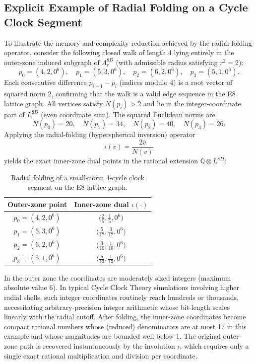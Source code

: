 \documentclass{article}
\begin{document}
\subsection{Explicit Example of Radial Folding on a Cycle Clock Segment}
To illustrate the memory and complexity reduction achieved by the radial-folding operator, consider the following closed walk of length 4 lying entirely in the outer-zone induced subgraph of \(\Lambda_r^{8D}\) (with admissible radius satisfying \(r^2=2\)):
\[
p_0 = (4, 2, 0^6),\quad
p_1 = (5, 3, 0^6),\quad
p_2 = (6, 2, 0^6),\quad
p_3 = (5, 1, 0^6).
\]
Each consecutive difference \(p_{i+1} - p_i\) (indices modulo 4) is a root vector of squared norm 2, confirming that the walk is a valid edge sequence in the E8 lattice graph. All vertices satisfy \(N(p_i) > 2\) and lie in the integer-coordinate part of \(L^{8D}\) (even coordinate sum). The squared Euclidean norms are
\[
N(p_0) = 20,\quad N(p_1) = 34,\quad N(p_2) = 40,\quad N(p_3) = 26.
\]
Applying the radial-folding (hyperspherical inversion) operator
\[
\iota(v) = \frac{2 \bar{v}}{N(v)}
\]
yields the exact inner-zone dual points in the rational extension \(\mathbb{Q} \otimes L^{8D}\):
\begin{table}[htbp]
\centering
\caption{Radial folding of a small-norm 4-cycle clock segment on the E8 lattice graph.}
\label{tab:radial-fold-example}
\begin{tabular}{c|c}
\textbf{Outer-zone point} & \textbf{Inner-zone dual \(\iota(\cdot)\)} \\
\hline
\(p_0 = (4,2,0^6)\) & \(\bigl( \frac{2}{5},\frac{1}{5},0^6 \bigr)\) \\
\(p_1 = (5,3,0^6)\) & \(\bigl( \frac{5}{17},\frac{3}{17},0^6 \bigr)\) \\
\(p_2 = (6,2,0^6)\) & \(\bigl( \frac{3}{10},\frac{1}{10},0^6 \bigr)\) \\
\(p_3 = (5,1,0^6)\) & \(\bigl( \frac{5}{13},\frac{1}{13},0^6 \bigr)\)
\end{tabular}
\end{table}
In the outer zone the coordinates are moderately sized integers (maximum absolute value 6). In typical Cycle Clock Theory simulations involving higher radial shells, such integer coordinates routinely reach hundreds or thousands, necessitating arbitrary-precision integer arithmetic whose bit-length scales linearly with the radial cutoff. After folding, the inner-zone coordinates become compact rational numbers whose (reduced) denominators are at most 17 in this example and whose magnitudes are bounded well below 1. The original outer-zone path is recovered instantaneously by the involution \(\iota\), which requires only a single exact rational multiplication and division per coordinate.
\end{document}
